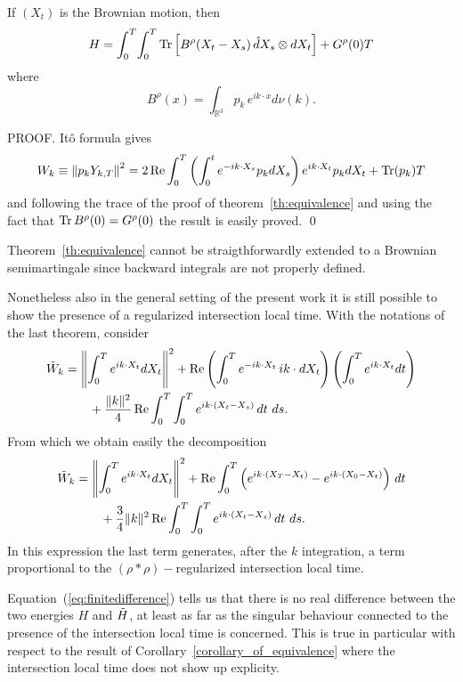 \begin{corollary}
\label{corollary_of_equivalence}
If $(X_t)$ is the Brownian motion, then
\begin{equation}
\begin{split}
H & = \int_0^T \!\int_0^T  \operatorname{Tr} \left[B^\rho(X_t-X_s)\, \hat{d}X_s \otimes
 dX_t \right]+ 
   G^\rho(0) T   \\
\end{split}
\label{equivalence2}
\end{equation}
where
$$
B^\rho(x) = \int_{\mathbb{R}^3} p_k \,e^{ik \cdot x} d\nu(k). 
$$
\end{corollary}

PROOF. 
It\^o formula gives
\begin{equation*}
W_k  \equiv  \left\| p_k Y_{k,T} \right\|^2 
 =  
2 \operatorname{Re} \int_0^T \left( \int_0^t e^{-ik \cdot X_s} p_k dX_s \right) e^{ik \cdot X_t}
p_k dX_t + \operatorname{Tr} (p_k) T
\end{equation*}
and following the trace of the proof of theorem~\ref{th:equivalence}
and using the fact that $\operatorname{Tr} B^\rho(0) = G^\rho(0)$ the
result is easily proved.
\qed

\begin{remark}
Theorem~\ref{th:equivalence} cannot be straigthforwardly extended to a Brownian
semimartingale since backward integrals are not properly defined. 

Nonetheless also in the general setting of the present work it is still
possible to show the presence of a regularized intersection local time.
With the notations of the last theorem, consider
\begin{equation*}
\begin{split}
\Tilde{W}_k & = \left\| \int_0^T e^{ik\cdot X_t} dX_t \right\|^2
+  \operatorname{Re} \left(\int_0^T e^{-ik\cdot X_t}\, ik \cdot dX_t\right) \left(\int_0^T
  e^{ik\cdot X_t} dt\right) \\
& \qquad + \frac{\|k\|^2}{4} \operatorname{Re} \int_0^T \int_0^T e^{ik\cdot (X_t-X_s)}\, dt~ds. 
\end{split}
\end{equation*}
From which we obtain easily the decomposition
\begin{equation*}
\begin{split}
\Tilde{W}_k & = \left\| \int_0^T e^{ik\cdot X_t} dX_t \right\|^2
+  \operatorname{Re} \int_0^T \left( e^{ik\cdot (X_T-X_t)}-e^{ik\cdot (X_0-X_t)}\right)\, 
 dt \\
& \qquad + \frac{3 }{4} \|k\|^2 \operatorname{Re} \int_0^T \int_0^T e^{ik\cdot (X_t-X_s)}\, dt~ds. 
\end{split}
\end{equation*}
In this expression the last term generates, after the $k$ integration, a term
proportional to the $(\rho*\rho)-$regularized intersection local time. 

Equation~(\ref{eq:finitedifference}) tells us that there is no real
difference between the two energies $H$ and $\Tilde{H}$, at least as
far as the singular behaviour connected to the presence of the
intersection local time is concerned. This is true in particular with
respect to the result of Corollary~\ref{corollary_of_equivalence}
where the intersection local time does not show up explicity.
\end{remark}


